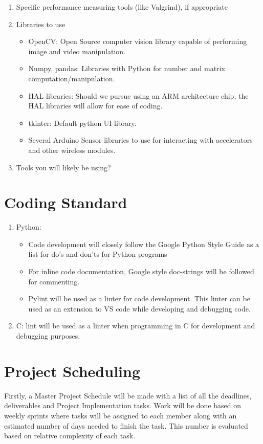 \documentclass{article}
\begin{document}
\begin{enumerate}
\item Specific performance measuring tools (like Valgrind), if
  appropriate
\item Libraries to use
\begin{itemize}
\item OpenCV: Open Source computer vision library capable of performing image and video manipulation.
\item Numpy, pandas: Libraries with Python for number and matrix computation/manipulation.
\item HAL libraries: Should we pursue using an ARM architecture chip, the HAL libraries will allow for ease of coding.
\item tkinter: Default python UI library.
\item Several Arduino Sensor libraries to use for interacting with accelerators and other wireless modules.
\end{itemize}
\item Tools you will likely be using?
\end{enumerate}

\section{Coding Standard}
\begin{enumerate}
\item Python:
\begin{itemize} 
\item Code development will closely follow the Google Python Style Guide as a list for do's and don'ts for Python programs
\item For inline code documentation, Google style doc-strings will be followed for commenting.
\item Pylint will be used as a linter for code development. This linter can be used as an extension to VS code while developing and debugging code.
\end{itemize}
\item C: lint will be used as a linter when programming in C for development and debugging purposes.
\end{enumerate}

\section{Project Scheduling}

Firstly, a Master Project Schedule will be made with a list of all the deadlines, deliverables and Project Implementation tasks. Work will be done based on weekly sprints where tasks will be assigned to each member along with an estimated number of days needed to finish the task. This number is evaluated based on relative complexity of each task.\\
\end{document}
